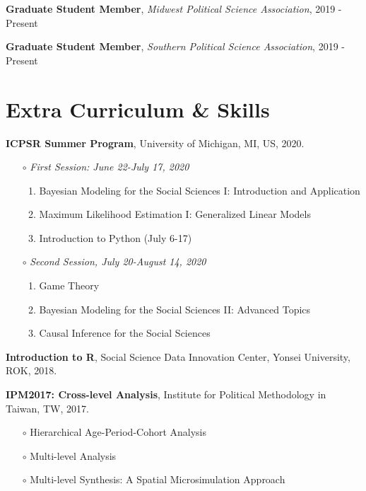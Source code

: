\documentclass[margin,line]{res}
\begin{document}
\begin{resume}
{\bf Graduate Student Member}, {\it Midwest Political Science Association}, 2019 - Present

{\bf Graduate Student Member}, {\it Southern Political Science Association}, 2019 - Present


\section{\sc Extra Curriculum \& Skills} 


{\bf ICPSR Summer Program}, University of Michigan, MI, US, 2020.

\begin{itemize} \itemsep -1mm 
	\item[$\circ$] \textit{First Session: June 22-July 17, 2020}
	\begin{enumerate} \itemsep -1mm 
		\item Bayesian Modeling for the Social Sciences I: Introduction and Application
		\item Maximum Likelihood Estimation I: Generalized Linear Models
		\item Introduction to Python (July 6-17)
	\end{enumerate}
	\item[$\circ$] \textit{Second Session, July 20-August 14, 2020}
	\begin{enumerate} \itemsep -1mm 
		\item Game Theory
		\item Bayesian Modeling for the Social Sciences II: Advanced Topics
		\item Causal Inference for the Social Sciences
	\end{enumerate}
\end{itemize}

\vspace{-.1cm}

{\bf Introduction to R}, Social Science Data Innovation Center, Yonsei University, ROK, 2018.

\vspace{-.1cm}

{\bf IPM2017: Cross-level Analysis}, Institute for Political Methodology in Taiwan, TW, 2017.

\begin{itemize} \itemsep -1mm 
	\item[$\circ$] Hierarchical Age-Period-Cohort Analysis
	\item[$\circ$] Multi-level Analysis
	\item[$\circ$] Multi-level Synthesis: A Spatial Microsimulation Approach
\end{itemize}


\end{resume}
\end{document}
